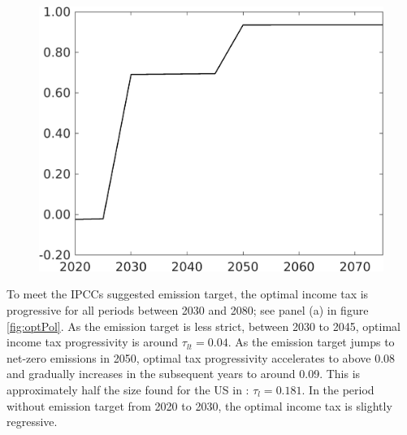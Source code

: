 \begin{figure}[h!!]
\begin{minipage}[]{0.4\textwidth}
		\includegraphics[width=1\textwidth]{../../codding_model/own_basedOnFried/optimalPol_elastS_DisuSci/figures/all_1705/Single_OPT_T_NoTaus_tauf_spillover0_sep1_BN0_ineq0_red0_etaa0.79.png}
	\end{minipage}
\end{figure} 

To meet the IPCCs suggested emission target, the optimal income tax is progressive for all periods between 2030 and 2080; see panel (a) in figure \ref{fig:optPol}. As the emission target is less strict, between 2030 to 2045, optimal income tax progressivity is around $\tau_{lt}=0.04$. As the emission target jumps to net-zero emissions in 2050, optimal tax progressivity accelerates to above 0.08 and gradually increases in the subsequent years to around 0.09. This is approximately half the size found for the US in \cite{Heathcote2017OptimalFramework}: $\tau_{l}=0.181$. 
In the period without emission target from 2020 to 2030, the optimal income tax is slightly regressive.

